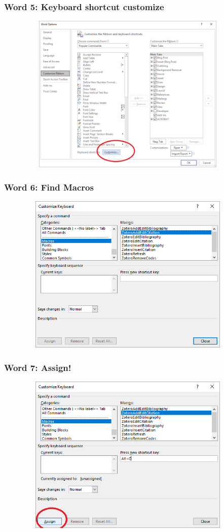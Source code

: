 \documentclass[12pt]{beamer}
\begin{document}
\begin{frame} \frametitle{Word 5: Keyboard shortcut customize} \begin{figure}[!h] \centering
	\includegraphics[height=3in, width = 4.25in,keepaspectratio]{zotero/word_5.png}
\end{figure} \end{frame}

\begin{frame} \frametitle{Word 6: Find Macros} \begin{figure}[!h] \centering
	\includegraphics[height=3in, width = 4.25in,keepaspectratio]{zotero/word_6.png}
\end{figure} \end{frame}

\begin{frame} \frametitle{Word 7: Assign!} \begin{figure}[!h] \centering
	\includegraphics[height=3in, width = 4.25in,keepaspectratio]{zotero/word_7.png}
\end{figure} \end{frame}
\end{document}
